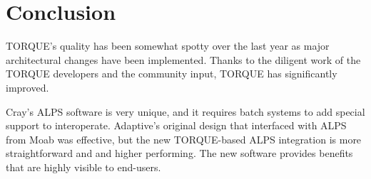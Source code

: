 \section{Conclusion}

TORQUE's quality has been somewhat spotty over the last year as major
architectural changes have been implemented.  Thanks to the diligent work of
the TORQUE developers and the community input, TORQUE has significantly
improved.

Cray's ALPS software is very unique, and it requires batch systems to add
special support to interoperate.  Adaptive's original design that interfaced
with ALPS from Moab was effective, but the new TORQUE-based ALPS integration is
more straightforward and and higher performing.  The new software provides
benefits that are highly visible to end-users.
